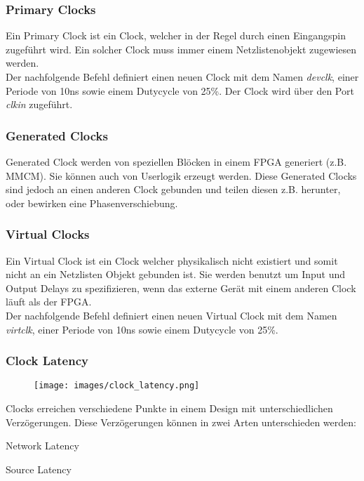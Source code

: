 \subsubsection{Primary Clocks}
Ein Primary Clock ist ein Clock, welcher in der Regel durch einen Eingangspin zugeführt wird. Ein solcher Clock muss immer einem Netzlistenobjekt zugewiesen werden. \\
Der nachfolgende Befehl definiert einen neuen Clock mit dem Namen \textit{devclk}, einer Periode von 10ns sowie einem Dutycycle von 25\%. Der Clock wird über den Port \textit{clkin} zugeführt.


\subsubsection{Generated Clocks}
Generated Clock werden von speziellen Blöcken in einem FPGA generiert (z.B. MMCM). Sie können auch von Userlogik erzeugt werden. Diese Generated Clocks sind jedoch an einen anderen Clock gebunden und teilen diesen z.B. herunter, oder bewirken eine Phasenverschiebung.

\subsubsection{Virtual Clocks}
Ein Virtual Clock ist ein Clock welcher physikalisch nicht existiert und somit nicht an ein Netzlisten Objekt gebunden ist. Sie werden benutzt um Input und Output Delays zu spezifizieren, wenn das externe Gerät mit einem anderen Clock läuft als der FPGA. \\
Der nachfolgende Befehl definiert einen neuen Virtual Clock mit dem Namen \textit{virtclk}, einer Periode von 10ns sowie einem Dutycycle von 25\%.


\subsubsection{Clock Latency}
\begin{minipage}{0.5\textwidth}
    \begin{figure}[H]
        \texttt{[image: images/clock\_latency.png]}
    \end{figure}
\end{minipage}
\hfill
\begin{minipage}{0.45\textwidth}
    Clocks erreichen verschiedene Punkte in einem Design mit unterschiedlichen Verzögerungen. Diese Verzögerungen können in zwei Arten unterschieden werden:
    \begin{compactitem}
        \item Network Latency
        \item Source Latency
    \end{compactitem} \ \\ \ \\
\end{minipage}

